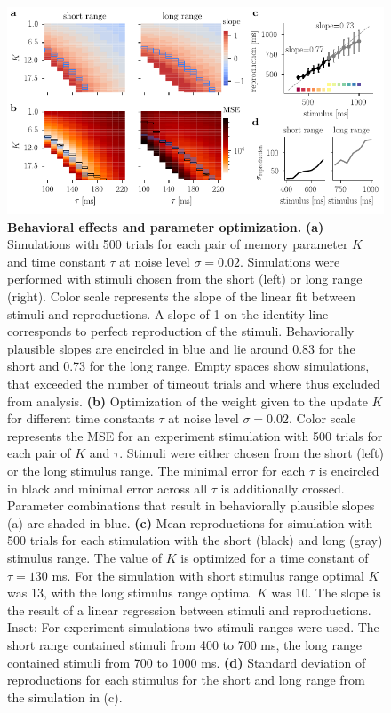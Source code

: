 \documentclass[10pt]{article}
\begin{document}
\begin{figure}[ht]
	\centering
	\includegraphics{figures/interIparams.pdf}
	\caption{\textbf{Behavioral effects and parameter optimization.} 
	\textbf{(a)} Simulations with 500 trials for each pair of memory parameter $K$ and time constant $\tau$ at noise level $\sigma = 0.02$. Simulations were performed with stimuli chosen from the short (left) or long range (right). Color scale represents the slope of the linear fit between stimuli and reproductions. A slope of 1 on the identity line corresponds to perfect reproduction of the stimuli. Behaviorally plausible slopes are encircled in blue and lie around 0.83 for the short and 0.73 for the long range. Empty spaces show simulations, that exceeded the number of timeout trials and where thus excluded from analysis.
	\textbf{(b)} Optimization of the weight given to the update $K$ for different time constants $\tau$ at noise level $\sigma = 0.02$. Color scale represents the MSE for an experiment stimulation with 500 trials for each pair of $K$ and $\tau$. Stimuli were either chosen from the short (left) or the long stimulus range. The minimal error for each $\tau$ is encircled in black and minimal error across all $\tau$ is additionally crossed. Parameter combinations that result in behaviorally plausible slopes (a) are shaded in blue.
	\textbf{(c)} Mean reproductions for simulation with 500 trials for each stimulation with the short (black) and long (gray) stimulus range. The value of $K$ is optimized for a time constant of $\tau = 130$ ms. For the simulation with short stimulus range optimal $K$ was 13, with the long stimulus range optimal $K$ was 10. 
		The slope is the result of a linear regression between stimuli and reproductions.
		Inset: For experiment simulations two stimuli ranges were used. The short range contained stimuli from 400 to 700 ms, the long range contained stimuli from 700 to 1000 ms.
	\textbf{(d)} Standard deviation of reproductions for each stimulus for the short and long range from the simulation in (c).
	}
\label{fig:parameter}
\end{figure}
\end{document}
